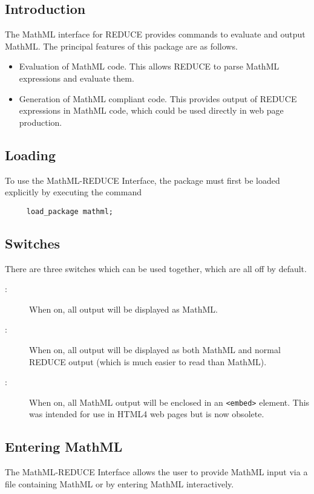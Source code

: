 \subsection{Introduction}

The MathML interface for REDUCE provides commands to evaluate and
output MathML\@.  The principal features of this package are as
follows.
\begin{itemize}
\item Evaluation of MathML code.  This allows REDUCE to parse MathML
  expressions and evaluate them.
\item Generation of MathML compliant code.  This provides output of
  REDUCE expressions in MathML code, which could be used directly in
  web page production.
\end{itemize}

\subsection{Loading}

To use the MathML-REDUCE Interface, the package must first be loaded
explicitly by executing the command
\begin{verbatim}
     load_package mathml;
\end{verbatim}

\subsection{Switches}

There are three switches which can be used together, which are all off
by default.
\begin{description}
\item[:] When on, all output will be displayed as MathML.
\item[:] When on, all output will be displayed as both MathML
  and normal REDUCE output (which is much easier to read than MathML).
\item[:] When on, all MathML output will be enclosed in an
  \verb|<embed>| element.  This was intended for use in HTML4 web
  pages but is now obsolete.
\end{description}

\subsection{Entering MathML}

The MathML-REDUCE Interface allows the user to provide MathML input
via a file containing MathML or by entering MathML interactively.

